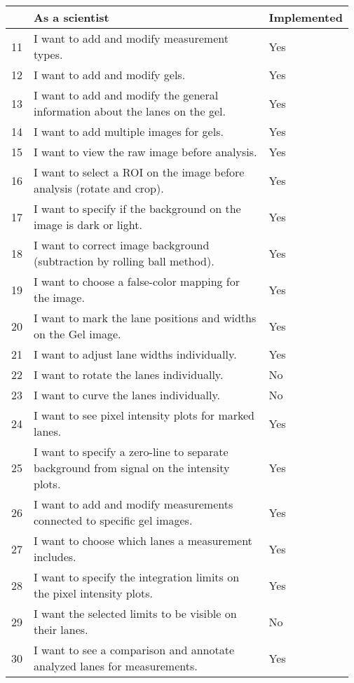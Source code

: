 \begin{table}[h!]
\small
\begin{tabular}{|p{0.02\linewidth}|p{0.80\linewidth}|p{0.15\linewidth}|}
\hline
   & \textbf{As a scientist} & \textbf{Implemented} \\
\hline
11 & I want to add and modify measurement types. & Yes\\ \hline
12 & I want to add and modify gels. & Yes\\ \hline
13 & I want to add and modify the general information about the lanes on the gel. & Yes\\ \hline
14 & I want to add multiple images for gels. & Yes\\ \hline
15 & I want to view the raw image before analysis. & Yes\\ \hline
16 & I want to select a ROI on the image before analysis (rotate and crop). & Yes\\ \hline
17 & I want to specify if the background on the image is dark or light. & Yes\\ \hline
18 & I want to correct image background (subtraction by rolling ball method). & Yes\\ \hline
19 & I want to choose a false-color mapping for the image. & Yes\\ \hline
20 & I want to mark the lane positions and widths on the Gel image. & Yes\\ \hline
21 & I want to adjust lane widths individually. & Yes\\ \hline
22 & I want to rotate the lanes individually. & No\\ \hline
23 & I want to curve the lanes individually. & No\\ \hline
24 & I want to see pixel intensity plots for marked lanes. & Yes\\ \hline
25 & I want to specify a zero-line to separate background from signal on the intensity plots. & Yes\\ \hline
26 & I want to add and modify measurements connected to specific gel images. & Yes\\ \hline
27 & I want to choose which lanes a measurement includes. & Yes\\ \hline
28 & I want to specify the integration limits on the pixel intensity plots. & Yes\\ \hline
29 & I want the selected limits to be visible on their lanes. & No\\ \hline
30 & I want to see a comparison and annotate analyzed lanes for measurements. & Yes\\ \hline

\end{tabular}
\end{table}
